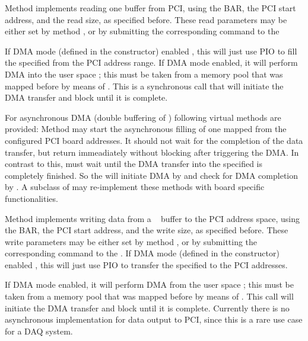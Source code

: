 \begin{compactenum}
\item {}
Method  
implements reading one buffer from PCI, using the BAR,
the PCI start address, and the read size, as specified before.
These read parameters may be either set by method 
,
or by submitting the corresponding command  to 
the 
    
If DMA mode (defined in the constructor)  enabled , 
this will just use PIO to fill the specified 
 from the PCI address range.
If DMA mode  enabled, it will
perform DMA into the user space ; this must be taken from a memory pool
that was mapped before by means of .
This is a synchronous call that will initiate the DMA transfer 
and block until it is complete.
 
For asynchronous DMA (double buffering of )
following virtual methods are provided:
Method  may start 
the asynchronous filling of one mapped  from the configured PCI 
board addresses. It should not wait for the completion of the data transfer, but
return immeadiately without blocking after triggering the DMA. In contrast to this,
 must 
wait until the DMA transfer into the specified  is completely
finished. So the  will initiate DMA 
by  and
check for DMA completion by .
A subclass of 
may re-implement these methods with board specific functionalities.


\item {}
Method  
implements writing data from a \dabc~ buffer to the PCI address space, 
using the BAR, the PCI start address, and the write size, as specified before.
These write parameters may be either set by method 
,
or by submitting the corresponding command  to 
the .
If DMA mode (defined in the constructor)  enabled , 
this will just use PIO to transfer the specified 
 to the PCI addresses.

If DMA mode  enabled, it will
perform DMA from the user space ; this must be taken from a memory pool
that was mapped before by means of . 
This call will initiate the DMA transfer and block until it is complete.
Currently there is no asynchronous implementation for data output to PCI,
since this is a rare use case for a DAQ system.


\end{compactenum} 


